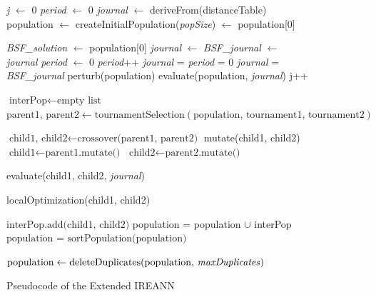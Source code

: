 \documentclass[twoside]{ctuthesis}
\theoremstyle{plain}
\theoremstyle{definition}
\theoremstyle{note}
\begin{document}
\begin{figure}
	\begin{algorithmic}[1]
		\small
		\State \emph{j} $\gets$ 0
		\State \emph{period} $\gets$ 0
		\State \emph{journal} $\gets$ deriveFrom(distanceTable)
		\State population $\gets$ createInitialPopulation(\emph{popSize})
		\State \emph{} $\gets$ population[0]
		
		
		\State \emph{BSF\_solution} $\gets$ population[0]
		\State \emph{journal} $\gets$ 
		\State \emph{BSF\_journal} $\gets$ \emph{journal}
		\State \emph{period} $\gets$ 0
		\State \emph{period}++	
		\State \emph{journal} = 
		\Else
		\State \emph{period} = 0
		\State \emph{journal} = \emph{BSF\_journal}
		\EndIf
		\State perturb(population)
		\State evaluate(population, \emph{journal})
		\EndIf
		\State j++
		
		
		\State $\text{interPop} \gets \text{empty list}$
		\State $\text{parent1, parent2} \gets \text{tournamentSelection}(\text{population, tournament1, tournament2})$
		
		\State $\text{child1, child2} \gets \text{crossover(parent1, parent2)}$
		\State mutate(child1, child2)
		\EndIf
		\Else
		\State $\text{child1} \gets \text{parent1.mutate()}$
		\State $\text{child2} \gets \text{parent2.mutate()}$
		\EndIf
		
		\State evaluate(child1, child2, \emph{journal})
		
		\State localOptimization(child1, child2)
		
		
		\State $\text{interPop.add(child1, child2)}$
		\EndWhile
		\State population = population $\cup$ interPop
		\State $\text{population = sortPopulation(population)}$
		
		\State $\text{population} \gets \text{deleteDuplicates(population, \emph{maxDuplicates})}$
		\EndFor
		\EndFunction
		
		
	\end{algorithmic}
	\caption{Pseudocode of the Extended IREANN}
	\label{fig:evoalg}
	
\end{figure}
\end{document}
